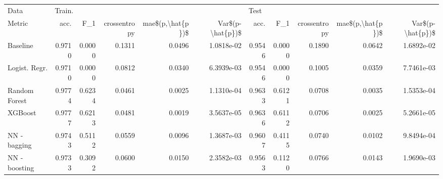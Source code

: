 \begin{tabular}{lrrrrrrrrrr}
\toprule
Data & \multicolumn{5}{l}{Train.} & \multicolumn{5}{l}{Test} \\
Metric &    acc. &     F\_1 & crossentropy & mae\$(p,\textbackslash hat\{p\})\$ & Var\$(p-\textbackslash hat\{p\})\$ &    acc. &     F\_1 & crossentropy & mae\$(p,\textbackslash hat\{p\})\$ & Var\$(p-\textbackslash hat\{p\})\$ \\
\midrule
Baseline      &  0.9710 &  0.0000 &       0.1311 &           0.0496 &       1.0818e-02 &  0.9546 &  0.0000 &       0.1890 &           0.0642 &       1.6892e-02 \\
Logist. Regr. &  0.9710 &  0.0000 &       0.0812 &           0.0340 &       6.3939e-03 &  0.9546 &  0.0000 &       0.1005 &           0.0359 &       7.7461e-03 \\
Random Forest &  0.9774 &  0.6234 &       0.0461 &           0.0025 &       1.1310e-04 &  0.9633 &  0.6121 &       0.0708 &           0.0035 &       1.5353e-04 \\
XGBoost       &  0.9777 &  0.6213 &       0.0481 &           0.0019 &       3.5637e-05 &  0.9636 &  0.6112 &       0.0706 &           0.0025 &       5.2661e-05 \\
NN - bagging  &  0.9743 &  0.5112 &       0.0559 &           0.0096 &       1.3687e-03 &  0.9607 &  0.4115 &       0.0740 &           0.0102 &       9.8494e-04 \\
NN - boosting &  0.9733 &  0.3092 &       0.0600 &           0.0150 &       2.3582e-03 &  0.9563 &  0.1120 &       0.0766 &           0.0143 &       1.9690e-03 \\
\bottomrule
\end{tabular}
